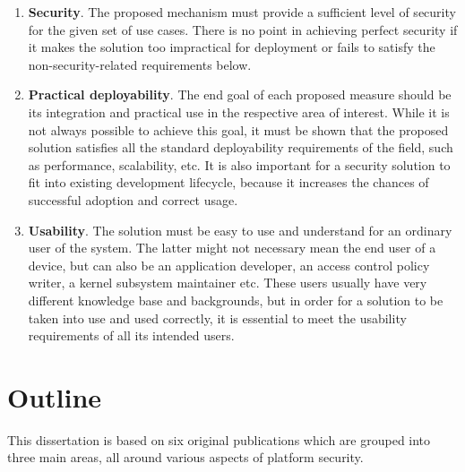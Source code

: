 \begin{enumerate}
	\item \textbf{Security}. The proposed mechanism must provide a sufficient level of security for the given set of use cases. There is no point in achieving perfect security if it makes the solution too impractical for deployment or fails to satisfy the non-security-related requirements below.      
	\item \textbf{Practical deployability}. The end goal of each proposed measure should be its integration and practical use in the respective area of interest. While it is not always possible to achieve this goal, it must be shown that the proposed solution satisfies all the standard deployability requirements of the field, such as performance, scalability, etc. It is also important for a security solution to fit into existing development lifecycle, because it increases the chances of successful adoption and correct usage. 
	\item \textbf{Usability}.	The solution must be easy to use and understand for an ordinary user of the system. The latter might not necessary mean the end user of a device, but can also be an application developer, an access control policy writer, a kernel subsystem maintainer etc. These users usually have very different knowledge base and backgrounds, but in order for a solution to be taken into use and used correctly, it is essential to meet the usability requirements of all its intended users. 
\end{enumerate}

\section{Outline}

This dissertation is based on six original publications which are grouped into three main areas, all around various aspects of platform security. 

